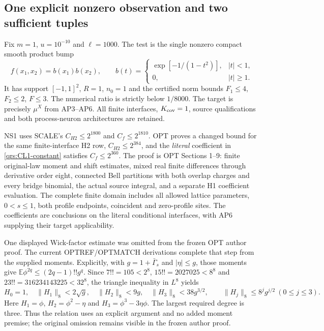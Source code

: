 \documentclass[11pt]{article}
\theoremstyle{plain}
\theoremstyle{definition}
\theoremstyle{remark}
\newcommand{\E}{\mathbb{E}}
\begin{document}
\subsection{One explicit nonzero observation and two sufficient tuples}
\label{qrs:certificate}

Fix $m=1$, $u=10^{-10}$ and $\ell=1000$. The test is the single nonzero
compact smooth product bump
\begin{equation}\label{qrs:bump}
 f(x_1,x_2)=b(x_1)b(x_2),\qquad
 b(t)=\begin{cases}\exp[-1/(1-t^2)],&|t|<1,\\0,&|t|\ge1.\end{cases}
\end{equation}
It has support $[-1,1]^2$, $R=1$, $n_0=1$ and the certified norm bounds
$F_1\le4$, $F_2\le2$, $F\le3$.
The numerical ratio is strictly below $1/8000$. The target is precisely
$\mu^X$ from AP3--AP6. All finite interfaces, $K_{\rm cov}=1$, source
qualifications and both process-neuron architectures are retained.

NS1 uses SCALE's $C_{H2}\le2^{1800}$ and $C_f\le2^{1810}$.
OPT proves a changed bound for the same finite-interface H2 row,
$C_{H2}\le2^{384}$, and the \emph{literal} coefficient in
\eqref{qrs:CL1-constant} satisfies $C_f\le2^{360}$.
The proof is OPT Sections 1--9: finite original-law moment and shift
estimates, mixed real finite differences through derivative order eight,
connected Bell partitions with both overlap charges and every bridge
binomial, the actual source integral, and a separate H1 coefficient
evaluation. The complete finite domain includes all allowed lattice
parameters, $0<s\le1$, both profile endpoints, coincident and
zero-profile sites. The coefficients are conclusions on the literal
conditional interfaces, with AP6 supplying their target applicability.

One displayed Wick-factor estimate was omitted from the frozen OPT author
proof. The current OPTREF/OPTMATCH derivations complete that step from the
supplied moments. Explicitly, with $g=1+\bar\Gamma_s$ and
$|\eta|\le g$, those moments give
$\E\phi^{2q}\le(2q-1)!!g^q$. Since
$7!!=105<2^8$, $15!!=2027025<8^8$ and
$23!!=316234143225<32^8$, the triangle inequality in $L^8$ yields
\begin{equation}\label{qrs:Wick-L8}
 H_0=1,\quad \|H_1\|_8<2\sqrt g,\quad
 \|H_2\|_8<9g,\quad \|H_3\|_8<38g^{3/2},\qquad
 \|H_j\|_8\le8^jg^{j/2}\ (0\le j\le3).
\end{equation}
Here $H_1=\phi$, $H_2=\phi^2-\eta$ and
$H_3=\phi^3-3\eta\phi$. The largest required degree is three.
Thus the relation uses an explicit argument and no added moment premise;
the original omission remains visible in the frozen author proof.
\end{document}
